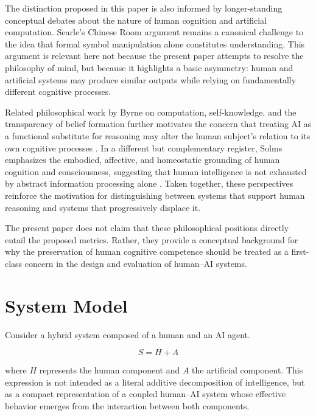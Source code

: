 \documentclass[11pt]{article}
\begin{document}
The distinction proposed in this paper is also informed by longer-standing
conceptual debates about the nature of human cognition and artificial
computation. Searle's Chinese Room argument \cite{searle1980} remains a
canonical challenge to the idea that formal symbol manipulation alone
constitutes understanding. This argument is relevant here not because
the present paper attempts to resolve the philosophy of mind, but because
it highlights a basic asymmetry: human and artificial systems may produce
similar outputs while relying on fundamentally different cognitive
processes.

Related philosophical work by Byrne on computation, self-knowledge, and
the transparency of belief formation further motivates the concern that
treating AI as a functional substitute for reasoning may alter the human
subject's relation to its own cognitive processes \cite{byrne-minds-machines,byrne-kim-2012,byrne2018}. In a different but complementary register,
Solms emphasizes the embodied, affective, and homeostatic grounding of
human cognition and consciousness, suggesting that human intelligence is
not exhausted by abstract information processing alone \cite{solms2021,solms-friston-2019}. Taken together, these perspectives reinforce the
motivation for distinguishing between systems that support human
reasoning and systems that progressively displace it.

The present paper does not claim that these philosophical positions
directly entail the proposed metrics. Rather, they provide a conceptual
background for why the preservation of human cognitive competence should
be treated as a first-class concern in the design and evaluation of
human--AI systems.


\section{System Model}

Consider a hybrid system composed of a human and an AI agent.

\begin{equation}
S = H + A
\end{equation}

where $H$ represents the human component and $A$ the artificial
component. This expression is not intended as a literal additive
decomposition of intelligence, but as a compact representation of a
coupled human--AI system whose effective behavior emerges from the
interaction between both components.
\end{document}
